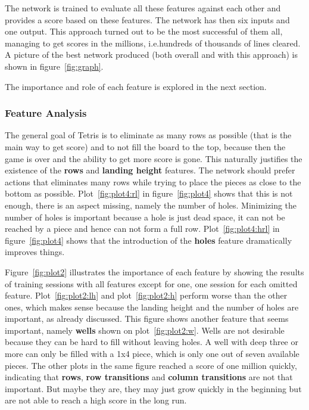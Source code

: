 \documentclass{article}
\begin{document}
The network is trained to evaluate all these features against each other and provides a score based on these features. The network has then six inputs and one output.
This approach turned out to be the most successful of them all, managing to get scores in the millions, i.e.\@ hundreds of thousands of lines cleared.
A picture of the best network produced (both overall and with this approach) is shown in figure~\ref{fig:graph}.

The importance and role of each feature is explored in the next section.

\subsubsection{Feature Analysis}\label{sec:features:anal}





The general goal of Tetris is to eliminate as many rows as possible (that is the main way to get score) and to not fill the board to the top, because then the game is over and the ability to get more score is gone.
This naturally justifies the existence of the \textbf{rows} and \textbf{landing height} features. The network should prefer actions that eliminates many rows while trying to place the pieces as close to the bottom as possible. Plot~\ref{fig:plot4:rl} in figure~\ref{fig:plot4} shows that this is not enough, there is an aspect missing, namely the number of holes. Minimizing the number of holes is important because a hole is just dead space, it can not be reached by a piece and hence can not form a full row. Plot~\ref{fig:plot4:hrl} in figure~\ref{fig:plot4} shows that the introduction of the \textbf{holes} feature dramatically improves things.

Figure~\ref{fig:plot2} illustrates the importance of each feature by showing the results of training sessions with all features except for one, one session for each omitted feature. Plot~\ref{fig:plot2:lh} and plot~\ref{fig:plot2:h} perform worse than the other ones, which makes sense because the landing height and the number of holes are important, as already discussed. This figure shows another feature that seems important, namely \textbf{wells} shown on plot~\ref{fig:plot2:w}.
Wells are not desirable because they can be hard to fill without leaving holes. A well with deep three or more can only be filled with a 1x4 piece, which is only one out of seven available pieces.
The other plots in the same figure reached a score of one million quickly, indicating that \textbf{rows}, \textbf{row transitions} and \textbf{column transitions} are not that important. But  maybe they are, they may just grow quickly in the beginning but are not able to reach a high score in the long run.
\end{document}
